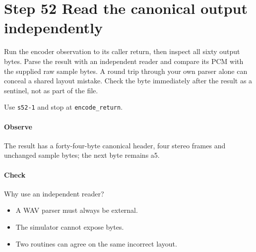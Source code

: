 \section{Step 52 Read the canonical output independently}\label{pcm-wav-s52}
Run the encoder observation to its caller return, then inspect all sixty output bytes. Parse the result with an independent reader and compare its PCM with the supplied raw sample bytes. A round trip through your own parser alone can conceal a shared layout mistake. Check the byte immediately after the result as a sentinel, not as part of the file.

Use \texttt{s52-1} and stop at \texttt{encode\_return}.

\paragraph{Observe} The result has a forty-four-byte canonical header, four stereo frames and unchanged sample bytes; the next byte remains a5.

\paragraph{Check} Why use an independent reader?
\begin{itemize}
  \item[A.] A WAV parser must always be external.
  \item[B.] The simulator cannot expose bytes.
  \item[C.] Two routines can agree on the same incorrect layout.
\end{itemize}
